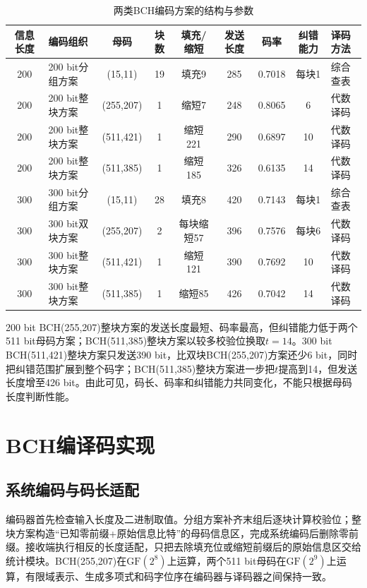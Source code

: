 \begin{table}[htbp]
  \centering
  \scriptsize
  \caption{两类BCH编码方案的结构与参数}
  \label{tab:bch-schemes}
  \setlength{\tabcolsep}{2.2pt}
  \begin{tabular}{c p{} c c c c c c p{}}
    \toprule
    信息长度 & 编码组织 & 母码 & 块数 & 填充/缩短 & 发送长度 & 码率 & 纠错能力 & 译码方法 \\
    \midrule
    200 & 200 bit分组方案 & (15,11) & 19 & 填充9 & 285 & 0.7018 & 每块1 & 综合查表 \\
    200 & 200 bit整块方案 & (255,207) & 1 & 缩短7 & 248 & 0.8065 & 6 & 代数译码 \\
    200 & 200 bit整块方案 & (511,421) & 1 & 缩短221 & 290 & 0.6897 & 10 & 代数译码 \\
    200 & 200 bit整块方案 & (511,385) & 1 & 缩短185 & 326 & 0.6135 & 14 & 代数译码 \\
    300 & 300 bit分组方案 & (15,11) & 28 & 填充8 & 420 & 0.7143 & 每块1 & 综合查表 \\
    300 & 300 bit双块方案 & (255,207) & 2 & 每块缩短57 & 396 & 0.7576 & 每块6 & 代数译码 \\
    300 & 300 bit整块方案 & (511,421) & 1 & 缩短121 & 390 & 0.7692 & 10 & 代数译码 \\
    300 & 300 bit整块方案 & (511,385) & 1 & 缩短85 & 426 & 0.7042 & 14 & 代数译码 \\
    \bottomrule
  \end{tabular}
\end{table}

200 bit BCH(255,207)整块方案的发送长度最短、码率最高，但纠错能力低于两个511 bit母码方案；BCH(511,385)整块方案以较多校验位换取$t=14$。300 bit BCH(511,421)整块方案只发送390 bit，比双块BCH(255,207)方案还少6 bit，同时把纠错范围扩展到整个码字；BCH(511,385)整块方案进一步把$t$提高到14，但发送长度增至426 bit。由此可见，码长、码率和纠错能力共同变化，不能只根据母码长度判断性能。

\section{BCH编译码实现}

\subsection{系统编码与码长适配}

编码器首先检查输入长度及二进制取值。分组方案补齐末组后逐块计算校验位；整块方案构造“已知零前缀+原始信息比特”的母码信息区，完成系统编码后删除零前缀。接收端执行相反的长度适配，只把去除填充位或缩短前缀后的原始信息区交给统计模块。BCH(255,207)在$\mathrm{GF}(2^8)$上运算，两个511 bit母码在$\mathrm{GF}(2^9)$上运算，有限域表示、生成多项式和码字位序在编码器与译码器之间保持一致。

